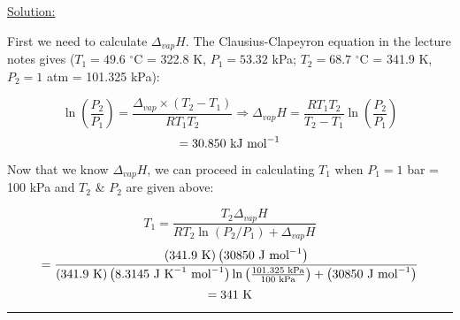\noindent
\underline{Solution:}

First we need to calculate $\Delta_{vap}H$. The Clausius-Clapeyron equation in the lecture notes gives ($T_1 = 49.6$ $^\circ$C = 322.8 K, $P_1 = 53.32$ kPa; $T_2 = 68.7$ $^\circ$C = 341.9 K, $P_2 = 1$ atm = 101.325 kPa):

$$\ln\left(\frac{P_2}{P_1}\right) = \frac{\Delta_{vap}\times\left(T_2 - T_1\right)}{RT_1T_2} \Rightarrow \Delta_{vap}H = \frac{RT_1T_2}{T_2 - T_1}\ln\left(\frac{P_2}{P_1}\right)$$
$$ = 30.850\textnormal{ kJ mol}^{-1}$$

Now that we know $\Delta_{vap}H$, we can proceed in calculating $T_1$ when $P_1 = 1$ bar = 100 kPa and $T_2$ \& $P_2$ are given above:

$$T_1 = \frac{T_2\Delta_{vap}H}{RT_2\ln\left(P_2/P_1\right) + \Delta_{vap}H}$$
$$ = \frac{\left(341.9\textnormal{ K}\right)\left(30850\textnormal{ J mol}^{-1}\right)}{\left(341.9\textnormal{ K}\right)\left(8.3145\textnormal{ J K}^{-1}\textnormal{ mol}^{-1}\right)\ln\left(\frac{101.325\textnormal{ kPa}}{100\textnormal{ kPa}}\right) + \left(30850\textnormal{ J mol}^{-1}\right)}$$
$$ = 341\textnormal{ K}$$

\hrule\vspace{0.5cm}

